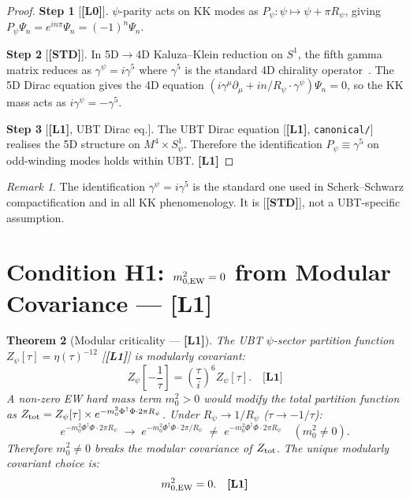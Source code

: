 \documentclass[12pt,a4paper]{article}
\newtheorem{theorem}{Theorem}[section]
\theoremstyle{remark}\newtheorem{remark}[theorem]{Remark}
\newcommand{\Lz}{\textbf{[L0]}}
\newcommand{\Lo}{\textbf{[L1]}}
\newcommand{\STD}{\textbf{[STD]}}
\begin{document}
\begin{proof}
\textbf{Step 1} [\Lz]. $\psi$-parity acts on KK modes as
$P_\psi: \psi\mapsto\psi+\pi R_\psi$, giving
$P_\psi\Psi_n = e^{in\pi}\Psi_n = (-1)^n\Psi_n$.

\textbf{Step 2} [\STD]. In 5D$\to$4D Kaluza--Klein reduction on $S^1$,
the fifth gamma matrix reduces as $\gamma^\psi = i\gamma^5$ where $\gamma^5$
is the standard 4D chirality operator~\cite{kaluza_klein_review}.
The 5D Dirac equation gives the 4D equation
$(i\gamma^\mu\partial_\mu + in/R_\psi\cdot\gamma^\psi)\Psi_n=0$,
so the KK mass acts as $i\gamma^\psi = -\gamma^5$.

\textbf{Step 3} [\Lo, UBT Dirac eq.]. The UBT Dirac equation
[\Lo, \texttt{canonical/}] realises the 5D structure on $M^4\times S^1_\psi$.
Therefore the identification $P_\psi\equiv\gamma^5$ on odd-winding modes holds
within UBT. \Lo
\end{proof}

\begin{remark}
The identification $\gamma^\psi=i\gamma^5$ is the standard one used in
Scherk--Schwarz compactification and in all KK phenomenology.
It is [\STD], not a UBT-specific assumption.
\end{remark}

\section{Condition H1: $m^2_{0,\rm EW}=0$ from Modular Covariance — \Lo}
\label{sec:modular_mass}

\begin{theorem}[Modular criticality — \Lo]
\label{thm:modular_criticality}
The UBT $\psi$-sector partition function $Z_\psi[\tau]=\eta(\tau)^{-12}$
[\Lo] is modularly covariant:
\[
  Z_\psi\!\left[-\frac{1}{\tau}\right]
  = \left(\frac{\tau}{i}\right)^6 Z_\psi[\tau]. \quad \Lo
\]
A non-zero EW hard mass term $m^2_0>0$ would modify the total partition
function as $Z_{\rm tot} = Z_\psi[\tau]\times e^{-m^2_0\Phi^\dagger\Phi\cdot
2\pi R_\psi}$. Under $R_\psi\to 1/R_\psi$ ($\tau\to -1/\tau$):
\[
  e^{-m^2_0\Phi^\dagger\Phi\cdot 2\pi R_\psi}
  \;\longrightarrow\;
  e^{-m^2_0\Phi^\dagger\Phi\cdot 2\pi/R_\psi}
  \;\neq\;
  e^{-m^2_0\Phi^\dagger\Phi\cdot 2\pi R_\psi}
  \quad (m^2_0\neq0).
\]
Therefore $m^2_0\neq 0$ breaks the modular covariance of $Z_{\rm tot}$.
The unique modularly covariant choice is:
\[
  m^2_{0,\rm EW} = 0. \quad \Lo
\]
\end{theorem}
\end{document}
